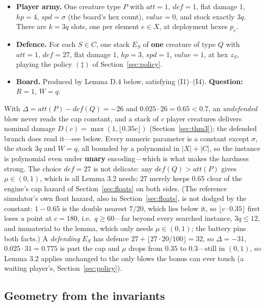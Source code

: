 \documentclass[11pt,a4paper]{article}
\theoremstyle{plain}
\theoremstyle{definition}
\theoremstyle{plain}
\theoremstyle{definition}
\theoremstyle{remark}
\begin{document}
\begin{itemize}
\item \textbf{Player army.} One creature type $P$ with $\mathit{att}=1$, $\mathit{def}=1$, flat
  damage $1$, $\mathit{hp}=4$, $\mathit{spd}=\sigma$ (the board's hex count),
  $\mathit{value}=0$, and stock exactly $3q$. There are $k=3q$ slots, one per element $e\in X$,
  at deployment hexes $p_e$.
\item \textbf{Defence.} For each $S\in C$, one stack $E_S$ of \textbf{one} creature of type $Q$
  with $\mathit{att}=1$, $\mathit{def}=27$, flat damage $1$, $\mathit{hp}=3$, $\mathit{spd}=1$,
  $\mathit{value}=1$, at hex $z_S$, playing the policy $(\ddagger)$ of Section~\ref{sec:policy}.
\item \textbf{Board.} Produced by Lemma D.4 below, satisfying (I1)--(I4). \textbf{Question:}
  $R=1$, $W=q$.
\end{itemize}

With $\Delta=\mathit{att}(P)-\mathit{def}(Q)=-26$ and $0.025\cdot 26=0.65<0.7$, an
\emph{undefended} blow never reads the cap constant, and a stack of $c$ player creatures
delivers nominal damage $D(c)=\max(1,\lfloor 0.35c\rfloor)$ (Section~\ref{sec:thm3}); the
defended branch does read it---see below. Every numeric parameter is a
constant except $\sigma$, the stock $3q$ and $W=q$, all bounded by a polynomial in $|X|+|C|$, so
the instance is polynomial even under \textbf{unary} encoding---which is what makes the hardness
strong. The choice $\mathit{def}=27$ is not delicate: any $\mathit{def}(Q)>\mathit{att}(P)$ gives
$\mu\in(0,1)$, which is all Lemma 3.2 needs; $27$ merely keeps $0.65$ clear of the
engine's cap hazard of Section~\ref{sec:floats} on both sides. (The reference simulator's own
float hazard, also in Section~\ref{sec:floats}, is not dodged by the constant: $1-0.65$ is the
double nearest $7/20$, which lies below it, so $\lfloor c\cdot 0.35\rfloor$ first loses a point
at $c=180$, i.e.\ $q\ge 60$---far beyond every searched instance, $3q\le 12$, and immaterial
to the lemma, which only needs $\mu\in(0,1)$; the battery pins both facts.) A \emph{defending} $E_S$ has
defence $27+\lfloor 27\cdot 20/100\rfloor=32$, so $\Delta=-31$, $0.025\cdot 31=0.775$ is past the
cap and $\mu$ drops from $0.35$ to $0.3$---still in $(0,1)$, so Lemma 3.2 applies unchanged to
the only blows the bonus can ever touch (a waiting player's, Section~\ref{sec:policy}).

\subsection{Geometry from the invariants}
\end{document}
